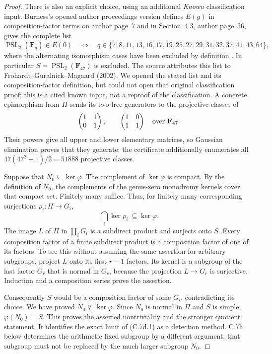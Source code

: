 \begin{proof}
There is also an explicit choice, using an additional \emph{Known}
classification input. Burness's opened author proceedings version
defines $E(g)$ in composition-factor terms on author page~7 and
in Section~4.3, author page~36, gives the complete list
\[
 \operatorname{PSL}_2(\mathbf F_q)\in E(0)
 \quad\Longleftrightarrow\quad
 q\in\{7,8,11,13,16,17,19,25,27,29,31,32,37,41,43,64\},
\]
where the alternating isomorphism cases have been excluded by definition
\cite[author pp.~7,36, Section~4.3]{BC_Burness2018}.
In particular $S=\operatorname{PSL}_2(\mathbf F_{47})$ is excluded.
The source attributes this list to Frohardt--Guralnick--Magaard (2002).
We opened the stated list and its composition-factor definition, but
could not open that original classification proof; this is a cited
known input, not a reproof of the classification. A concrete epimorphism
from $\Pi$ sends its two free generators to the projective classes of
\[
       \begin{pmatrix}1&1\\0&1\end{pmatrix},\qquad
       \begin{pmatrix}1&0\\1&1\end{pmatrix}
                           \quad\hbox{over }\mathbf F_{47}.
\]
Their powers give all upper and lower elementary matrices, so Gaussian
elimination proves that they generate; the certificate additionally
enumerates all $47(47^2-1)/2=51888$ projective classes.

Suppose that $N_0\subseteq\ker\varphi$. The complement of
$\ker\varphi$ is compact. By the definition of $N_0$, the complements
of the genus-zero monodromy kernels cover that compact set.
Finitely many suffice. Thus, for finitely many corresponding
surjections $\rho_i:\Pi\to G_i$,
\[
                  \bigcap_i\ker\rho_i\ \subseteq\ker\varphi.
\]
The image $L$ of $\Pi$ in $\prod_iG_i$ is a subdirect product and
surjects onto $S$. Every composition factor of a finite subdirect
product is a composition factor of one of its factors. To see this
without assuming the same assertion for arbitrary subgroups, project
$L$ onto its first $r-1$ factors. Its kernel is a subgroup of the last
factor $G_r$ that is normal in $G_r$, because the projection
$L\to G_r$ is surjective. Induction and a composition series prove
the assertion.

Consequently $S$ would be a composition factor of some $G_i$,
contradicting its choice. We have proved
$N_0\not\subseteq\ker\varphi$. Since $N_0$ is normal in $\Pi$
and $S$ is simple, $\varphi(N_0)=S$. This proves the asserted
nontriviality and the stronger quotient statement. It identifies
the exact limit of (C.7d.1) as a detection method. C.7h below
determines the arithmetic fixed subgroup by a different argument;
that subgroup must not be replaced by the much larger subgroup $N_0$.
\end{proof}
